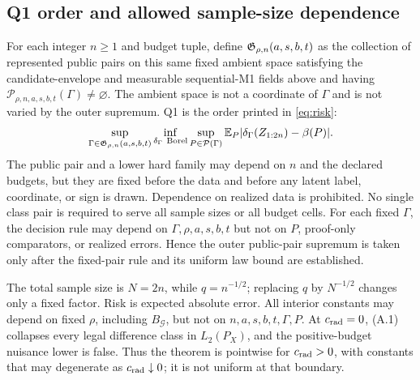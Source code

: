 \subsection{Q1 order and allowed sample-size dependence}

For each integer \(n\ge1\) and budget tuple, define
\(\mathfrak G_{\rho,n}(a,s,b,t)\) as the collection of represented public
pairs on this same fixed ambient space satisfying the candidate-envelope and
measurable sequential-M1 fields above and having
\(\mathcal P_{\rho,n,a,s,b,t}(\Gamma)\ne\varnothing\).  The ambient space is not a coordinate
of \(\Gamma\) and is not varied by the outer supremum.
Q1 is the order printed in \eqref{eq:risk}:
\[
 \sup_{\Gamma\in\mathfrak G_{\rho,n}(a,s,b,t)}
 \inf_{\delta_\Gamma\ {\rm Borel}}
 \sup_{P\in\mathcal P(\Gamma)}
 \mathbb E_P|\delta_\Gamma(Z_{1:2n})-\beta(P)|.
\]
The public pair and a lower hard family may depend on \(n\) and the declared
budgets, but they are fixed before the data and before any latent label,
coordinate, or sign is drawn.  Dependence on realized data is prohibited.
No single class pair is required to serve all sample sizes or all budget
cells.  For each fixed \(\Gamma\), the decision rule may depend on
\(\Gamma,\rho,a,s,b,t\) but not on \(P\), proof-only comparators, or
realized errors.  Hence the outer public-pair supremum is taken only after the
fixed-pair rule and its uniform law bound are established.

The total sample size is \(N=2n\), while \(q=n^{-1/2}\); replacing \(q\) by
\(N^{-1/2}\) changes only a fixed factor.  Risk is expected absolute error.
All interior constants may depend on fixed \(\rho\), including
\(B_{\mathcal G}\), but not on
\(n,a,s,b,t,\Gamma,P\).  At \(c_{\rm rad}=0\), (A.1) collapses every legal
difference class in \(L_2(P_X)\), and the positive-budget nuisance lower is
false.  Thus the theorem is pointwise for \(c_{\rm rad}>0\), with constants
that may degenerate as \(c_{\rm rad}\downarrow0\); it is not uniform at that
boundary.
